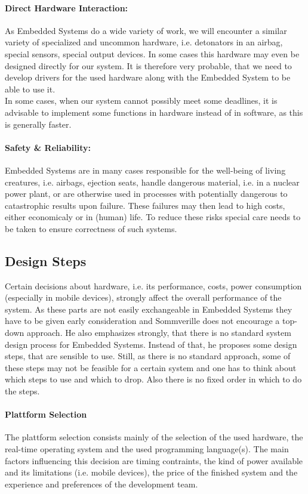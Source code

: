 \documentclass[10pt,a4paper,titlepage,draft]{article} %
\begin{document}
\paragraph{Direct Hardware Interaction:}
As Embedded Systems do a wide variety of work, we will encounter a similar variety of specialized and uncommon hardware, i.e. detonators in an airbag, special sensors, special output devices.
In some cases this hardware may even be designed directly for our system.
It is therefore very probable, that we need to develop drivers for the used hardware along with the Embedded System to be able to use it.
\\
In some cases, when our system cannot possibly meet some deadlines, it is advisable to implement some functions in hardware instead of in software, as this is generally faster.

\paragraph{Safety \& Reliability:}
Embedded Systems are in many cases responsible for the well-being of living creatures, i.e. airbags, ejection seats, handle dangerous material, i.e. in a nuclear power plant, or are otherwise used in processes with potentially dangerous to catastrophic results upon failure.
These failures may then lead to high costs, either economicaly or in (human) life.
To reduce these risks special care needs to be taken to ensure correctness of such systems.

\subsection{Design Steps}
Certain decisions about hardware, i.e. its performance, costs, power consumption (especially in mobile devices), strongly affect the overall performance of the system.
As these parts are not easily exchangeable in Embedded Systems they have to be given early consideration and Sommverille does not encourage a top-down approach\cite[p. 540]{sommerville}.
He also emphasizes strongly, that there is no standard system design process for Embedded Systems.
Instead of that, he proposes some design steps, that are sensible to use.
Still, as there is no standard approach, some of these steps may not be feasible for a certain system and one has to think about which steps to use and which to drop.
Also there is no fixed order in which to do the steps.

\paragraph{Plattform Selection}
The plattform selection consists mainly of the selection of the used hardware, the real-time operating system and the used programming language(s).
The main factors influencing this decision are timing contraints, the kind of power available and its limitations (i.e. mobile devices), the price of the finished system and the experience and preferences of the development team.
\end{document}
